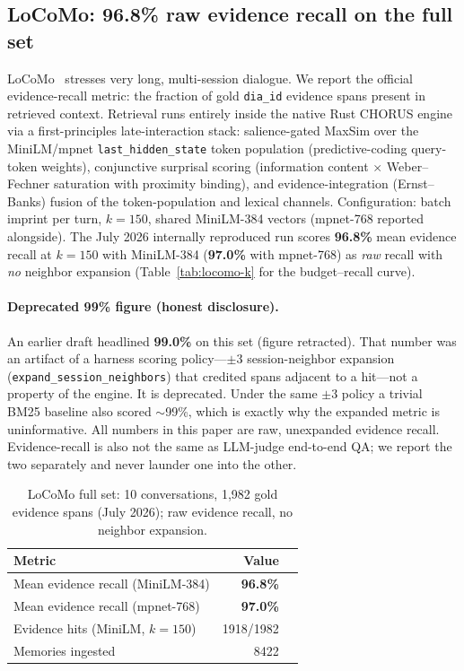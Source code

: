 \documentclass[11pt]{article}
\begin{document}
\subsection{LoCoMo: 96.8\% raw evidence recall on the full set}
LoCoMo~\cite{maharana2024locomo} stresses very long, multi-session dialogue. We
report the official evidence-recall metric: the fraction of gold \texttt{dia\_id}
evidence spans present in retrieved context. Retrieval runs entirely inside the
native Rust CHORUS engine via a first-principles late-interaction stack:
salience-gated MaxSim over the MiniLM/mpnet \texttt{last\_hidden\_state} token
population (predictive-coding query-token weights), conjunctive surprisal scoring
(information content $\times$ Weber--Fechner saturation with proximity binding),
and evidence-integration (Ernst--Banks) fusion of the token-population and
lexical channels. Configuration: batch imprint per turn, $k{=}150$, shared
MiniLM-384 vectors (mpnet-768 reported alongside). The July 2026 internally
reproduced run scores \textbf{96.8\%} mean evidence recall at $k{=}150$ with
MiniLM-384 (\textbf{97.0\%} with mpnet-768) as \emph{raw} recall with \emph{no}
neighbor expansion (Table~\ref{tab:locomo-k} for the budget--recall curve).

\paragraph{Deprecated 99\% figure (honest disclosure).} An earlier
draft headlined \textbf{99.0\%} on this set (figure retracted). That number was an artifact of a
harness scoring policy---$\pm3$ session-neighbor expansion
(\texttt{expand\_session\_neighbors}) that credited spans adjacent to a hit---not
a property of the engine. It is deprecated. Under the same $\pm3$ policy a trivial
BM25 baseline also scored $\sim$99\%, which is exactly why the expanded metric is
uninformative. All numbers in this paper are raw, unexpanded evidence recall.
Evidence-recall is also not the same as LLM-judge end-to-end QA; we report the two
separately and never launder one into the other.

\begin{table}[h]
\centering
\caption{LoCoMo full set: 10 conversations, 1{,}982 gold evidence spans (July 2026);
raw evidence recall, no neighbor expansion.}
\begin{tabular}{lrr}
\toprule
Metric & Value \\
\midrule
Mean evidence recall (MiniLM-384) & \textbf{96.8\%} \\
Mean evidence recall (mpnet-768) & \textbf{97.0\%} \\
Evidence hits (MiniLM, $k{=}150$) & 1918/1982 \\
Memories ingested & 8422 \\
\bottomrule
\end{tabular}
\end{table}
\end{document}
